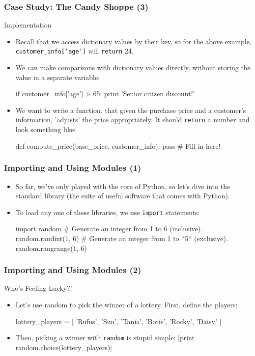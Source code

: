 \documentclass[10pt]{beamer}
\begin{document}
\begin{frame}[fragile]
  \frametitle{Case Study: The Candy Shoppe (3)}
  \begin{block}{Implementation}
    \begin{itemize}
      \item Recall that we access dictionary values by their key, so for the above example, \texttt{customer\_info['age']} will \texttt{return} 24.
      \item We can make comparisons with dictionary values directly, without storing the value in a separate variable:
        \begin{pythoncode}
  if customer_info['age'] > 65:
    print 'Senior citizen discount!'
        \end{pythoncode}
      \item We want to write a function, that given the purchase price and a customer's information, 'adjusts' the price appropriately.
        It should \texttt{return} a number and look something like:
        \begin{pythoncode}
  def compute_price(base_price, customer_info):
    pass # Fill in here!
        \end{pythoncode}
    \end{itemize}
  \end{block}
\end{frame}

\begin{frame}[fragile]
  \frametitle{Importing and Using Modules (1)}
  \begin{itemize}
    \item So far, we've only played with the core of Python, so let's dive into the standard library (the suite of useful software that comes with Python).
    \item To load any one of these libraries, we use \texttt{import} statements:
      \begin{pythoncode}
  import random
  # Generate an integer from 1 to 6 (inclusive).
  random.randint(1, 6)
  # Generate an integer from 1 to *5* (exclusive).
  random.rangrange(1, 6)
      \end{pythoncode}
  \end{itemize}
\end{frame}

\begin{frame}[fragile]
  \frametitle{Importing and Using Modules (2)}
  \begin{block}{Who's Feeling Lucky?!}
    \begin{itemize}
      \item Let's use random to pick the winner of a lottery.
        First, define the players:
        \begin{pythoncode}
  lottery_players = [
    'Rufus', 'Sun', 'Tania',
    'Boris', 'Rocky', 'Daisy'
  ]
        \end{pythoncode}
      \item Then, picking a winner with \texttt{random} is stupid simple:
        |print random.choice(lottery_players)|
    \end{itemize}
  \end{block}
\end{frame}
    
\end{document}
